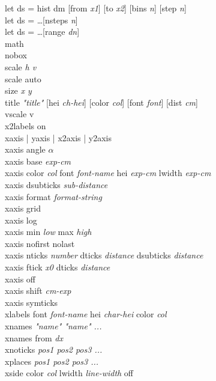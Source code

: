{\sf let ds = hist dm [from {\it x1}] [to {\it x2}] [bins {\it n}] [step {\it n}]} \\
{\sf let ds = \ldots [nsteps {\it n}]} \\
{\sf let ds = \ldots [range {\it dn}]} \\
{\sf math } \\
{\sf nobox } \\
{\sf scale {\it h v}} \\
{\sf scale auto} \\
{\sf size {\it x y }}\\
{\sf title {\it "title"}  [hei {\it ch-hei}] [color {\it col}] [font {\it font}] [dist {\it cm}]  }   \\
{\sf vscale v} \\
{\sf x2labels on} \\
{\sf xaxis | yaxis | x2axis | y2axis}\\
{\sf xaxis angle $\alpha$} \\
{\sf xaxis base {\it exp-cm}}  \\
{\sf xaxis color {\it col} font {\it font-name}  hei {\it exp-cm} lwidth {\it exp-cm}} \\
{\sf xaxis dsubticks {\it sub-distance} }  \\
{\sf xaxis format {\it format-string} } \\
{\sf xaxis grid }  \\
{\sf xaxis log}  \\
{\sf xaxis min {\it low} max {\it high}}  \\
{\sf xaxis nofirst nolast}  \\
{\sf xaxis nticks {\it number} dticks {\it distance} dsubticks {\it distance}} \\
{\sf xaxis ftick {\it x0} dticks {\it distance}} \\
{\sf xaxis {\sf off}}  \\
{\sf xaxis shift {\it cm-exp}}  \\
{\sf xaxis symticks} \\
{\sf xlabels font {\it font-name} hei {\it char-hei} color {\it col} }\\
{\sf xnames {\it "name"  "name" ...}}  \\
{\sf xnames from {\it dx}}  \\
{\sf xnoticks {\it pos1 pos2 pos3 ...}}  \\
{\sf xplaces {\it pos1 pos2 pos3 ...}}  \\
{\sf xside color {\it col} lwidth {\it line-width} off  } \\
